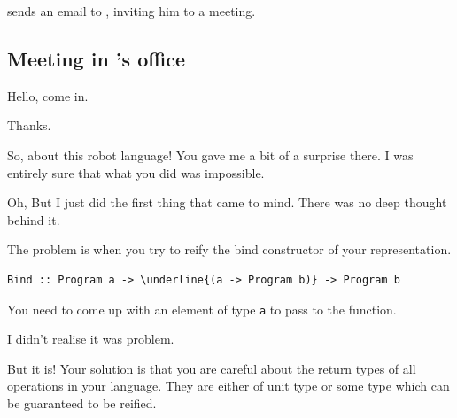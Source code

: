 \docname{} sends an email to \studname{}, inviting him to a meeting. 

\subsection{Meeting in \docname{}'s office} %


\begin{dialogue} 

\speak{\docname{}} Hello, come in. 

\speak{\studname{}} Thanks. 

\speak{\docname{}} So, about this robot language! You gave me a bit of a 
surprise there. I was entirely sure that what you did was impossible. 

\speak{\studname{}} Oh, But I just did the first thing that came to mind. 
There was no deep thought behind it. 

\speak{\docname{}} The problem is 
 when you try to reify the bind constructor of your representation.
\end{dialogue} 


\begin{small}
\begin{Verbatim}[commandchars=\\\{\}] 
Bind :: Program a -> \underline{(a -> Program b)} -> Program b 
\end{Verbatim}
\end{small}


\begin{dialogue}
\speak{\docname{}} You need to come up with an element of type {\tt a} to 
pass to the function. 

\speak{\studname{}} I didn't realise it was problem. 

\speak{\docname{}} But it is! Your solution is that you are careful
about the return types of all operations in your language. They are
either of unit type or some type which can be guaranteed to be reified.

\end {dialogue} 

